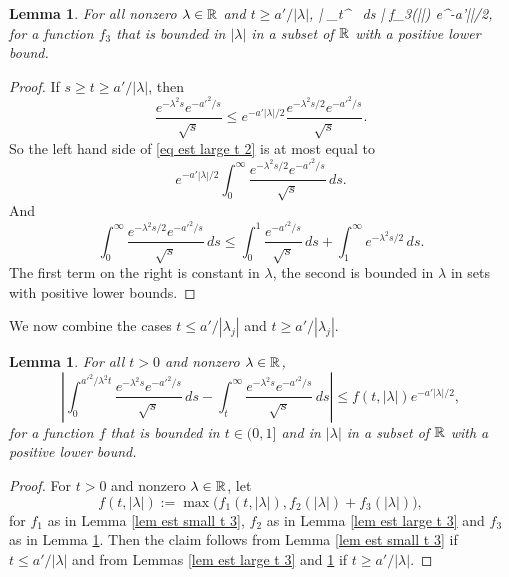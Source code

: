 \documentclass[11pt]{article}
\theoremstyle{plain}
\newtheorem{lemma}[theorem]{Lemma}
\theoremstyle{definition}
\theoremstyle{remark}
\numberwithin{equation}{section}
\begin{document}
\begin{lemma}\label{lem est large t 4}
For all  nonzero $\lambda \in \mathbb{R}$ and $t \geq a'/|\lambda|$,
\left| \int_t^{\infty}
  \, ds \right| \leq f_3(|\lambda|) e^{-a'|\lambda|/2},
\eeq
for a function $f_3$ that is bounded in $|\lambda|$ in a subset of $\mathbb{R}$ with a positive lower bound.
\end{lemma}
\begin{proof}
If $s \geq t \geq a'/|\lambda|$, then
\[
 \frac{e^{-\lambda^2 s} e^{-a'^2/s}}{\sqrt{s}}  \leq e^{-a'|\lambda|/2}  \frac{e^{-\lambda^2 s/2} e^{-a'^2/s}}{\sqrt{s}}.
\]
So the left hand side of \eqref{eq est large t 2} is at most equal to
\[
e^{-a'|\lambda|/2} \int_0^{\infty} \frac{e^{-\lambda^2 s/2} e^{-a'^2/s}}{\sqrt{s}}\, ds.
\]
And
\[
\int_0^{\infty} \frac{e^{-\lambda^2 s/2} e^{-a'^2/s}}{\sqrt{s}}\, ds \leq
\int_0^{1} \frac{ e^{-a'^2/s}}{\sqrt{s}}\, ds+
\int_1^{\infty} e^{-\lambda^2 s/2} \, ds.
\]
The first term on the right is constant in $\lambda$, the second is bounded in $\lambda$ in sets with positive lower bounds.
\end{proof}

We now combine the cases $t \leq a'/|\lambda_j|$ and $t \geq a'/|\lambda_j|$.
\begin{lemma}\label{lem dominator}
For all $t> 0$ and nonzero $\lambda \in \mathbb{R}$,
\[
\left| \int_0^{a'^2/\lambda^2t}
 \frac{e^{-\lambda^2 s} e^{-a'^2/s}}{\sqrt{s}}\, ds -
\int_t^{\infty}
 \frac{e^{-\lambda^2 s} e^{-a'^2/s}}{\sqrt{s}}\, ds  \right|
 \leq f(t, |\lambda|) e^{-a'|\lambda|/2},
\]
 for a function $f$ that is bounded in $t \in (0,1]$ and in $|\lambda|$ in a subset of $\mathbb{R}$ with a positive lower bound.
\end{lemma}
\begin{proof}
For $t>0$ and nonzero $\lambda \in \mathbb{R}$, let
\[
f(t, |\lambda|):= \max\bigl(f_1(t, |\lambda|), f_2(|\lambda|)+f_3(|\lambda|) \bigr),
\]
for $f_1$ as in Lemma \ref{lem est small t 3}, $f_2$ as in Lemma \ref{lem est large t 3} and $f_3$ as in Lemma \ref{lem est large t 4}. Then  the
claim follows from  Lemma \ref{lem est small t 3} if $t \leq a'/|\lambda|$ and from Lemmas   \ref{lem est large t 3} and \ref{lem est large t 4} if $t\geq a'/|\lambda|$.
\end{proof}
\end{document}
